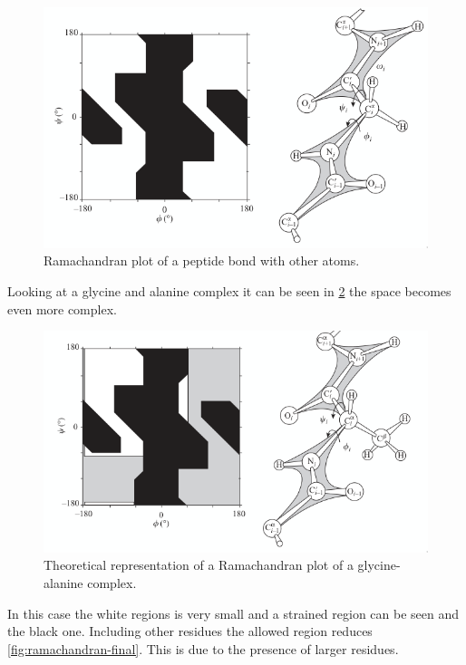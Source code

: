 	\begin{figure}[H]
		\centering
		\includegraphics[width=\textwidth]{ramachandran-complex.png}
		\caption{Ramachandran plot of a peptide bond with other atoms.}
		\label{fig:ramachandran-complex}
	\end{figure}

		Looking at a glycine and alanine complex it can be seen in \ref{fig:ala_gly-theo} the space becomes even more complex.

	\begin{figure}[H]
		\centering
		\includegraphics[width=\textwidth]{ala-gly-theo.png}
		\caption{Theoretical representation of a Ramachandran plot of a glycine-alanine complex.}
		\label{fig:ala_gly-theo}
	\end{figure}

	In this case the white regions is very small and a strained region can be seen and the black one.
	Including other residues the allowed region reduces \ref{fig:ramachandran-final}.
	This is due to the presence of larger residues.

